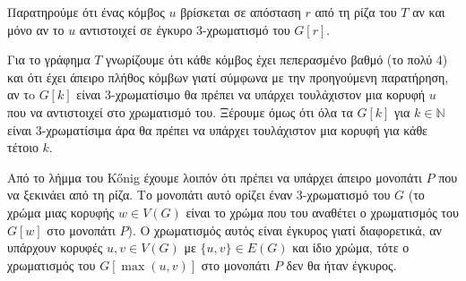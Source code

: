 \documentclass[a4paper, oneside, 11pt]{article}
\theoremstyle{definition}
\begin{document}
\begin{enumerate}
   Παρατηρούμε ότι ένας κόμβος $u$ βρίσκεται σε απόσταση $r$ από τη ρίζα
   του $T$ αν και μόνο αν το $u$ αντιστοιχεί σε έγκυρο 3-χρωματισμό
   του $G[r]$.

   Για το γράφημα $T$ γνωρίζουμε ότι κάθε κόμβος έχει πεπερασμένο βαθμό
   (το πολύ 4) και ότι έχει άπειρο πλήθος κόμβων γιατί σύμφωνα με την
   προηγούμενη παρατήρηση, αν τo $G[k]$ είναι 3-χρωματίσιμο θα πρέπει
   να υπάρχει τουλάχιστον μια κορυφή $u$ που να αντιστοιχεί στο
   χρωματισμό του. Ξέρουμε όμως ότι όλα τα $G[k]$ για $k \in \mathbb{N}$
   είναι 3-χρωματίσιμα άρα θα πρέπει να υπάρχει τουλάχιστον μια κορυφή
   για κάθε τέτοιο $k$.

   Από το λήμμα του K\H{o}nig έχουμε λοιπόν ότι πρέπει να υπάρχει άπειρο
   μονοπάτι $P$ που να ξεκινάει από τη ρίζα. Το μονοπάτι αυτό ορίζει
   έναν 3-χρωματισμό του $G$ (το χρώμα μιας κορυφής $w \in V(G)$
   είναι το χρώμα που του αναθέτει ο χρωματισμός του $G[w]$ στο μονοπάτι
   $P$). O χρωματισμός αυτός είναι έγκυρος γιατί διαφορετικά, αν υπάρχουν
   κορυφές $u, v \in V(G)$ με $\{u, v\} \in E(G)$ και ίδιο χρώμα, τότε
   ο χρωματισμός του $G[\max(u, v)]$ στο μονοπάτι $P$ δεν θα ήταν έγκυρος.
\end{enumerate}
\end{document}
